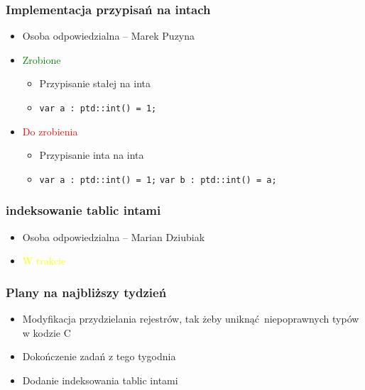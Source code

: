\documentclass{beamer}
\begin{document}
	\begin{frame}
		\frametitle{Implementacja przypisań na intach}
		\begin{itemize}
			\item Osoba odpowiedzialna -- Marek Puzyna
			\item\textcolor{green}{Zrobione}
			\begin{itemize}
				\item Przypisanie stałej na inta
				\item \texttt{var a : ptd::int() = 1;}
			\end{itemize}
			\item\textcolor{red}{Do zrobienia}
			\begin{itemize}
				\item Przypisanie inta na inta
				\item \texttt{var a : ptd::int() = 1;}\newline
				\texttt{var b : ptd::int() = a;}
			\end{itemize}
		\end{itemize}
	\end{frame}

	\begin{frame}
		\frametitle{indeksowanie tablic intami}
		\begin{itemize}
			\item Osoba odpowiedzialna -- Marian Dziubiak
			\item\textcolor{yellow}{W trakcie}
		\end{itemize}
	\end{frame}
	
	\begin{frame}
		\frametitle{Plany na najbliższy tydzień}
		\begin{itemize}
			\item Modyfikacja przydzielania rejestrów, tak żeby uniknąć niepoprawnych typów w kodzie C
			\item Dokończenie zadań z tego tygodnia
			\item Dodanie indeksowania tablic intami
		\end{itemize}
	\end{frame}
\end{document}
